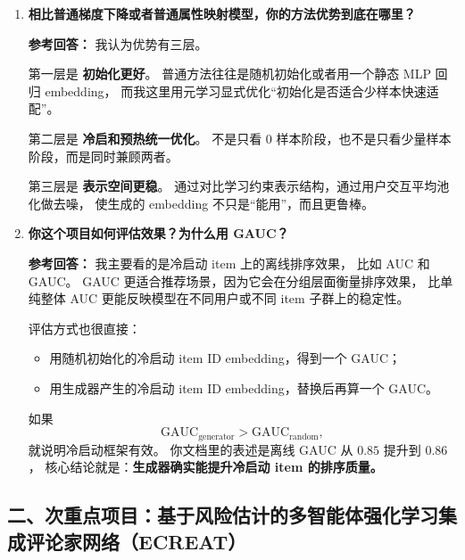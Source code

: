 \documentclass[11pt,a4paper]{ctexart}
\begin{document}
\begin{enumerate}[leftmargin=*, label=\textbf{Q\arabic*.}]
\item \textbf{相比普通梯度下降或者普通属性映射模型，你的方法优势到底在哪里？}

\textbf{参考回答：}
我认为优势有三层。

第一层是 \textbf{初始化更好}。
普通方法往往是随机初始化或者用一个静态 MLP 回归 embedding，
而我这里用元学习显式优化“初始化是否适合少样本快速适配”。

第二层是 \textbf{冷启和预热统一优化}。
不是只看 0 样本阶段，也不是只看少量样本阶段，而是同时兼顾两者。

第三层是 \textbf{表示空间更稳}。
通过对比学习约束表示结构，通过用户交互平均池化做去噪，
使生成的 embedding 不只是“能用”，而且更鲁棒。

\item \textbf{你这个项目如何评估效果？为什么用 GAUC？}

\textbf{参考回答：}
我主要看的是冷启动 item 上的离线排序效果，
比如 AUC 和 GAUC。
GAUC 更适合推荐场景，因为它会在分组层面衡量排序效果，
比单纯整体 AUC 更能反映模型在不同用户或不同 item 子群上的稳定性。

评估方式也很直接：
\begin{itemize}
\item 用随机初始化的冷启动 item ID embedding，得到一个 GAUC；
\item 用生成器产生的冷启动 item ID embedding，替换后再算一个 GAUC。
\end{itemize}
如果
\[
\text{GAUC}_{\text{generator}} > \text{GAUC}_{\text{random}},
\]
就说明冷启动框架有效。
你文档里的表述是离线 GAUC 从 $0.85$ 提升到 $0.86$，
核心结论就是：\textbf{生成器确实能提升冷启动 item 的排序质量。}

\end{enumerate}

\subsection*{二、次重点项目：基于风险估计的多智能体强化学习集成评论家网络（ECREAT）}
\end{document}
